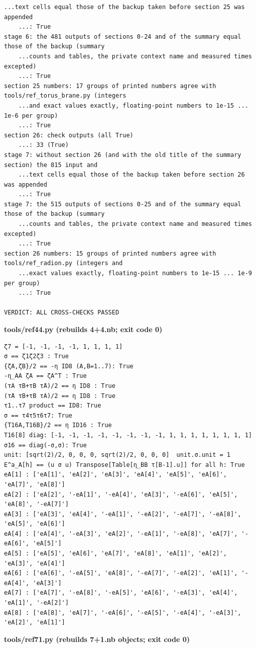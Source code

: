 \documentclass[10pt,a4paper]{article}
\begin{document}
\begin{Verbatim}[fontsize=\small,frame=single,framesep=2mm]
    ...text cells equal those of the backup taken before section 25 was appended               
    ...: True
stage 6: the 481 outputs of sections 0-24 and of the summary equal those of the backup (summary
    ...counts and tables, the private context name and measured times excepted)                
    ...: True
section 25 numbers: 17 groups of printed numbers agree with tools/ref_torus_brane.py (integers
    ...and exact values exactly, floating-point numbers to 1e-15 ... 1e-6 per group)           
    ...: True
section 26: check outputs (all True)                                                           
    ...: 33 (True)
stage 7: without section 26 (and with the old title of the summary section) the 815 input and
    ...text cells equal those of the backup taken before section 26 was appended               
    ...: True
stage 7: the 515 outputs of sections 0-25 and of the summary equal those of the backup (summary
    ...counts and tables, the private context name and measured times excepted)                
    ...: True
section 26 numbers: 15 groups of printed numbers agree with tools/ref_radion.py (integers and
    ...exact values exactly, floating-point numbers to 1e-15 ... 1e-9 per group)               
    ...: True

VERDICT: ALL CROSS-CHECKS PASSED
\end{Verbatim}
\textbf{tools/ref44.py (rebuilds 4+4.nb; exit code 0)}

\begin{Verbatim}[fontsize=\small,frame=single,framesep=2mm]
ζ7 = [-1, -1, -1, -1, 1, 1, 1, 1]
σ == ζ1ζ2ζ3 : True
{ζA,ζB}/2 == -η ID8 (A,B=1..7): True
-η_AA ζA == ζA^T : True
(τA τ̄B+τB τ̄A)/2 == η ID8 : True
(τ̄A τB+τ̄B τA)/2 == η ID8 : True
τ1..τ7 product == ID8: True
σ == τ4τ5τ6τ7: True
{T16A,T16B}/2 == η ID16 : True
T16[8] diag: [-1, -1, -1, -1, -1, -1, -1, -1, 1, 1, 1, 1, 1, 1, 1, 1]
σ16 == diag(-σ,σ): True
unit: [sqrt(2)/2, 0, 0, 0, sqrt(2)/2, 0, 0, 0]  unit.σ.unit = 1
E^a_A[h] == (u σ u) Transpose[Table[η_BB τ[B-1].u]] for all h: True
eA[1] : ['eA[1]', 'eA[2]', 'eA[3]', 'eA[4]', 'eA[5]', 'eA[6]', 'eA[7]', 'eA[8]']
eA[2] : ['eA[2]', '-eA[1]', '-eA[4]', 'eA[3]', '-eA[6]', 'eA[5]', 'eA[8]', '-eA[7]']
eA[3] : ['eA[3]', 'eA[4]', '-eA[1]', '-eA[2]', '-eA[7]', '-eA[8]', 'eA[5]', 'eA[6]']
eA[4] : ['eA[4]', '-eA[3]', 'eA[2]', '-eA[1]', '-eA[8]', 'eA[7]', '-eA[6]', 'eA[5]']
eA[5] : ['eA[5]', 'eA[6]', 'eA[7]', 'eA[8]', 'eA[1]', 'eA[2]', 'eA[3]', 'eA[4]']
eA[6] : ['eA[6]', '-eA[5]', 'eA[8]', '-eA[7]', '-eA[2]', 'eA[1]', '-eA[4]', 'eA[3]']
eA[7] : ['eA[7]', '-eA[8]', '-eA[5]', 'eA[6]', '-eA[3]', 'eA[4]', 'eA[1]', '-eA[2]']
eA[8] : ['eA[8]', 'eA[7]', '-eA[6]', '-eA[5]', '-eA[4]', '-eA[3]', 'eA[2]', 'eA[1]']
\end{Verbatim}
\textbf{tools/ref71.py (rebuilds 7+1.nb objects; exit code 0)}
\end{document}
